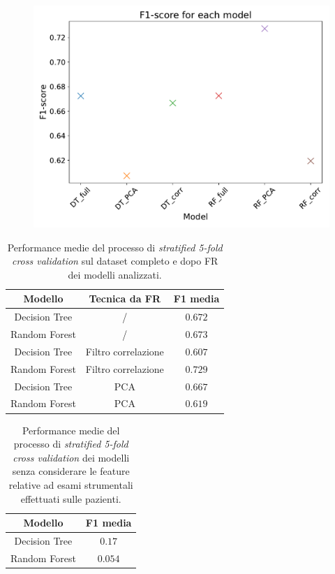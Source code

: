 \begin{figure}
	\centering
	\includegraphics[width=0.8\linewidth]{images/fscore}
	\caption{}
	\label{fig:fscore}
\end{figure}

\begin{table}
\centering
\caption{Performance medie del processo di \textit{stratified 5-fold cross validation} sul dataset completo e dopo FR dei modelli analizzati.}
\label{tab:f1score}
\begin{tabular}{|c|c|c|}
	\toprule
	Modello & Tecnica da FR & F1 media \\ 
	\midrule 
	Decision Tree & / & $0.672$ \\  
	Random Forest & / & $0.673$ \\ 
	Decision Tree & Filtro correlazione & $0.607$ \\ 
	Random Forest & Filtro correlazione & $0.729$ \\ 
	Decision Tree & PCA & $0.667$ \\ 
	Random Forest & PCA & $0.619$ \\ 
	\bottomrule
\end{tabular}
\end{table}

\begin{table}
	\centering
	\caption{Performance medie del processo di \textit{stratified 5-fold cross validation} dei modelli senza considerare le feature relative ad esami strumentali effettuati sulle pazienti.}
	\label{tab:noexamsscore}
	\begin{tabular}{|c|c|}
		\toprule
		Modello & F1 media \\ 
		\midrule 
		Decision Tree & $0.17$ \\  
		Random Forest  & $0.054$ \\ 
		\bottomrule
	\end{tabular}
\end{table}

